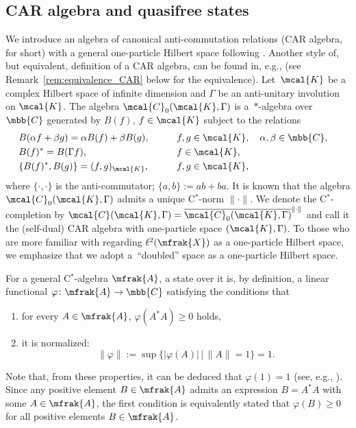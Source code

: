 \subsection{CAR algebra and quasifree states}
We introduce an algebra of canonical anti-commutation relations (CAR algebra, for short) with a general one-particle Hilbert space following \cite{Araki1970,Binnenhei1995}.
Another style of, but equivalent, definition of a CAR algebra, can be found in, e.g., \cite{BratteliRobinson1997} (see Remark~\ref{rem:equivalence_CAR} below for the equivalence).
Let~$\mcal{K}$ be a complex Hilbert space of infinite dimension and $\Gamma$ be an anti-unitary involution on $\mcal{K}$.
The algebra $\mcal{C}_{0}(\mcal{K},\Gamma)$ is a~$\ast$-algebra over $\mbb{C}$ generated by $B(f)$, $f\in\mcal{K}$ subject to the relations
\begin{alignat*}{3}
	&B(\alpha f+\beta g)=\alpha B(f)+\beta B(g),\qquad && f, g\in\mcal{K},\quad \alpha,\beta\in\mbb{C},& \\
	&B(f)^{\ast}= B(\Gamma f),\qquad && f\in\mcal{K},&\\
	&\{B(f)^{\ast}, B(g)\}=(f,g)_{\mcal{K}}, \qquad && f,g\in\mcal{K},&
\end{alignat*}
where $\{\cdot,\cdot\}$ is the anti-commutator; $\{a,b\}:=ab+ba$.
It is known that the algebra $\mcal{C}_{0}(\mcal{K},\Gamma)$ admits a unique C$^{\ast}$-norm $\|\cdot\|$. We denote the C$^{\ast}$-completion by $\mcal{C}(\mcal{K},\Gamma)=\overline{\mcal{C}_{0}(\mcal{K},\Gamma)}^{\|\cdot\|}$ and call it the (self-dual) CAR algebra with one-particle space $(\mcal{K},\Gamma)$. To those who are more familiar with regarding $\ell^{2}(\mfrak{X})$ as a one-particle Hilbert space, we emphasize that we adopt a~``doubled'' space as a one-particle Hilbert space.

For a general C$^{\ast}$-algebra $\mfrak{A}$, a state over it is, by definition, a linear functional $\varphi\colon \mfrak{A}\to\mbb{C}$ satisfying the conditions that
\begin{enumerate}\itemsep=0pt
\item[1)] 	for every $A\in\mfrak{A}$, $\varphi (A^{\ast}A)\ge 0$ holds,
\item[2)] 	it is normalized:
		\begin{equation*}
			\|\varphi\|:=\sup\big\{|\varphi (A)|\, \big|\, \|A\|=1\big\}=1.
		\end{equation*}
\end{enumerate}
Note that, from these properties, it can be deduced that $\varphi (1)=1$ (see, e.g., \cite[Chapter~I, Section~9]{Takesaki1979}). Since any positive element $B\in\mfrak{A}$ admits an expression $B=A^{\ast}A$ with some $A\in\mfrak{A}$, the first condition is equivalently stated that $\varphi (B)\ge 0$ for all positive elements $B\in \mfrak{A}$.

